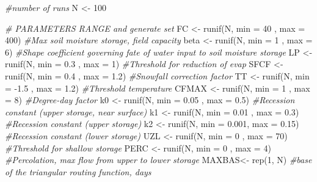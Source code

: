 \documentclass[
]{book}
\newenvironment{Shaded}{\begin{snugshade}}{\end{snugshade}}
\newcommand{\AttributeTok}[1]{\textcolor[rgb]{0.77,0.63,0.00}{#1}}
\newcommand{\CommentTok}[1]{\textcolor[rgb]{0.56,0.35,0.01}{\textit{#1}}}
\newcommand{\DecValTok}[1]{\textcolor[rgb]{0.00,0.00,0.81}{#1}}
\newcommand{\FloatTok}[1]{\textcolor[rgb]{0.00,0.00,0.81}{#1}}
\newcommand{\FunctionTok}[1]{\textcolor[rgb]{0.00,0.00,0.00}{#1}}
\newcommand{\NormalTok}[1]{#1}
\newcommand{\OtherTok}[1]{\textcolor[rgb]{0.56,0.35,0.01}{#1}}
\newcommand{\SpecialCharTok}[1]{\textcolor[rgb]{0.00,0.00,0.00}{#1}}
\begin{document}
\begin{Shaded}
\begin{Highlighting}[]
\CommentTok{\#number of runs}
\NormalTok{N }\OtherTok{\textless{}{-}} \DecValTok{100}

\CommentTok{\# PARAMETERS RANGE and generate set}
\NormalTok{FC    }\OtherTok{\textless{}{-}} \FunctionTok{runif}\NormalTok{(N, }\AttributeTok{min =} \DecValTok{40}\NormalTok{   , }\AttributeTok{max =} \DecValTok{400}\NormalTok{)  }\CommentTok{\#Max soil moisture storage, field capacity}
\NormalTok{beta  }\OtherTok{\textless{}{-}} \FunctionTok{runif}\NormalTok{(N, }\AttributeTok{min =} \DecValTok{1}\NormalTok{    , }\AttributeTok{max =} \DecValTok{6}\NormalTok{)    }\CommentTok{\#Shape coefficient governing fate of water input to soil moisture storage}
\NormalTok{LP    }\OtherTok{\textless{}{-}} \FunctionTok{runif}\NormalTok{(N, }\AttributeTok{min =} \FloatTok{0.3}\NormalTok{   , }\AttributeTok{max =} \DecValTok{1}\NormalTok{)    }\CommentTok{\#Threshold for reduction of evap}
\NormalTok{SFCF  }\OtherTok{\textless{}{-}} \FunctionTok{runif}\NormalTok{(N, }\AttributeTok{min =} \FloatTok{0.4}\NormalTok{  , }\AttributeTok{max =} \FloatTok{1.2}\NormalTok{)  }\CommentTok{\#Snowfall correction factor}
\NormalTok{TT    }\OtherTok{\textless{}{-}} \FunctionTok{runif}\NormalTok{(N, }\AttributeTok{min =} \SpecialCharTok{{-}}\FloatTok{1.5}\NormalTok{ , }\AttributeTok{max =} \FloatTok{1.2}\NormalTok{)  }\CommentTok{\#Threshold temperature}
\NormalTok{CFMAX }\OtherTok{\textless{}{-}} \FunctionTok{runif}\NormalTok{(N, }\AttributeTok{min =} \DecValTok{1}\NormalTok{    , }\AttributeTok{max =} \DecValTok{8}\NormalTok{)    }\CommentTok{\#Degree{-}day factor}
\NormalTok{k0    }\OtherTok{\textless{}{-}} \FunctionTok{runif}\NormalTok{(N, }\AttributeTok{min =} \FloatTok{0.05}\NormalTok{ , }\AttributeTok{max =} \FloatTok{0.5}\NormalTok{)  }\CommentTok{\#Recession constant (upper storage, near surface)}
\NormalTok{k1    }\OtherTok{\textless{}{-}} \FunctionTok{runif}\NormalTok{(N, }\AttributeTok{min =} \FloatTok{0.01}\NormalTok{ , }\AttributeTok{max =} \FloatTok{0.3}\NormalTok{)  }\CommentTok{\#Recession constant (upper storage)}
\NormalTok{k2    }\OtherTok{\textless{}{-}} \FunctionTok{runif}\NormalTok{(N, }\AttributeTok{min =} \FloatTok{0.001}\NormalTok{, }\AttributeTok{max =} \FloatTok{0.15}\NormalTok{) }\CommentTok{\#Recession constant (lower storage)}
\NormalTok{UZL   }\OtherTok{\textless{}{-}} \FunctionTok{runif}\NormalTok{(N, }\AttributeTok{min =} \DecValTok{0}\NormalTok{    , }\AttributeTok{max =} \DecValTok{70}\NormalTok{)   }\CommentTok{\#Threshold for shallow storage}
\NormalTok{PERC  }\OtherTok{\textless{}{-}} \FunctionTok{runif}\NormalTok{(N, }\AttributeTok{min =} \DecValTok{0}\NormalTok{    , }\AttributeTok{max =} \DecValTok{4}\NormalTok{)    }\CommentTok{\#Percolation, max flow from upper to lower storage}
\NormalTok{MAXBAS}\OtherTok{\textless{}{-}} \FunctionTok{rep}\NormalTok{(}\DecValTok{1}\NormalTok{, N)   }\CommentTok{\#base of the triangular routing function, days}


\end{Highlighting}
\end{Shaded}
\end{document}
